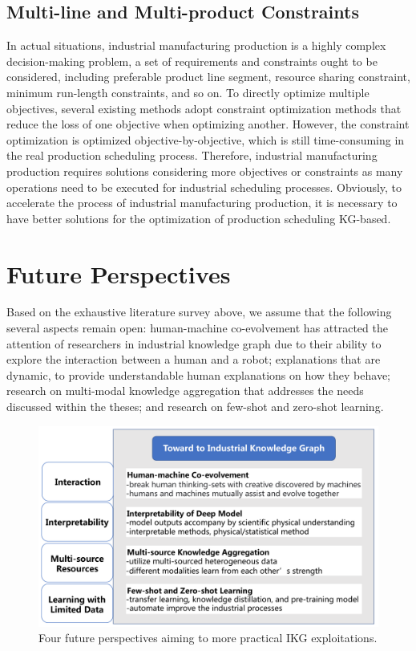 \documentclass[11pt]{article}
\begin{document}
\subsection{Multi-line and Multi-product Constraints}
\par{In actual situations, industrial manufacturing production is a highly complex decision-making problem, a set of requirements and constraints ought to be considered, including preferable product line segment, resource sharing constraint, minimum run-length constraints, and so on.
To directly optimize multiple objectives, several existing methods \cite{bib62, bib63} adopt constraint optimization methods that reduce the loss of one objective when optimizing another.
However, the constraint optimization is optimized objective-by-objective, which is still time-consuming in the real production scheduling process.
Therefore, industrial manufacturing production requires solutions considering more objectives or constraints as many operations need to be executed for industrial scheduling processes.
Obviously, to accelerate the process of industrial manufacturing production, it is necessary to have better solutions for the optimization of production scheduling KG-based.}

\section{Future Perspectives}\label{sec6}


\par{Based on the exhaustive literature survey above, we assume that the following several aspects remain open: human-machine co-evolvement has attracted the attention of researchers in industrial knowledge graph due to their ability to explore the interaction between a human and a robot; explanations that are dynamic, to provide understandable human explanations on how they behave; research on multi-modal knowledge aggregation that addresses the needs discussed within the theses; and research on few-shot and zero-shot learning.}


\begin{figure}[htbp]
	\centering
	\includegraphics[width=0.7\linewidth]{submissions/industrial-kg/future_perspectives.pdf}
	\caption{Four future perspectives aiming to more practical IKG exploitations.}
	\label{future_perspectives}
\end{figure}
\end{document}
